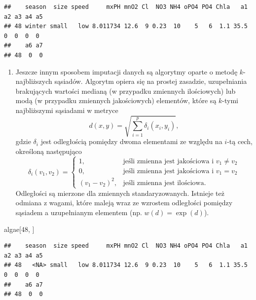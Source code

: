 \documentclass[
]{book}
\newenvironment{Shaded}{\begin{snugshade}}{\end{snugshade}}
\newcommand{\DecValTok}[1]{\textcolor[rgb]{0.00,0.00,0.81}{#1}}
\newcommand{\NormalTok}[1]{#1}
\providecommand{\tightlist}{%
  \setlength{\itemsep}{0pt}\setlength{\parskip}{0pt}}
\theoremstyle{plain}
\theoremstyle{definition}
\theoremstyle{definition}
\theoremstyle{definition}
\theoremstyle{definition}
\theoremstyle{remark}
\begin{document}
\begin{verbatim}
##    season  size speed     mxPH mnO2 Cl  NO3 NH4 oPO4 PO4 Chla   a1 a2 a3 a4 a5
## 48 winter small   low 8.011734 12.6  9 0.23  10    5   6  1.1 35.5  0  0  0  0
##    a6 a7
## 48  0  0
\end{verbatim}

\begin{enumerate}
\def\labelenumi{\arabic{enumi}.}
\setcounter{enumi}{3}
\tightlist
\item
  Jeszcze innym sposobem imputacji danych są algorytmy oparte o metodę \(k\)-najbliższych sąsiadów. Algorytm opiera się na prostej zasadzie, uzupełniania brakujących wartości medianą (w przypadku zmiennych ilościowych) lub modą (w przypadku zmiennych jakościowych) elementów, które są \(k\)-tymi najbliższymi sąsiadami w metryce
  \begin{equation}\label{knn}
   d(x,y)=\sqrt{\sum_{i=1}^{p}\delta_i(x_i,y_i)},
  \end{equation}
  gdzie \(\delta_i\) jest odległością pomiędzy dwoma elementami ze względu na \(i\)-tą cech, określoną następująco
  \begin{equation}\label{metryka}
   \delta_i(v_1, v_2)=\begin{cases}
       1,& \text{jeśli zmienna jest jakościowa i }v_1\neq v_2\\
       0,& \text{jeśli zmienna jest jakościowa i }v_1=v_2\\
       (v_1-v_2)^2,& \text{jeśli zmienna jest ilościowa.}
   \end{cases}
  \end{equation}
  Odległości są mierzone dla zmiennych standaryzowanych. Istnieje też odmiana z wagami, które maleją wraz ze wzrostem odległości pomiędzy sąsiadem a uzupełnianym elementem (np. \(w(d)=\exp(d)\)).
\end{enumerate}

\begin{Shaded}
\begin{Highlighting}[]
\NormalTok{algae[}\DecValTok{48}\NormalTok{, ]}
\end{Highlighting}
\end{Shaded}

\begin{verbatim}
##    season  size speed     mxPH mnO2 Cl  NO3 NH4 oPO4 PO4 Chla   a1 a2 a3 a4 a5
## 48   <NA> small   low 8.011734 12.6  9 0.23  10    5   6  1.1 35.5  0  0  0  0
##    a6 a7
## 48  0  0
\end{verbatim}
\end{document}
